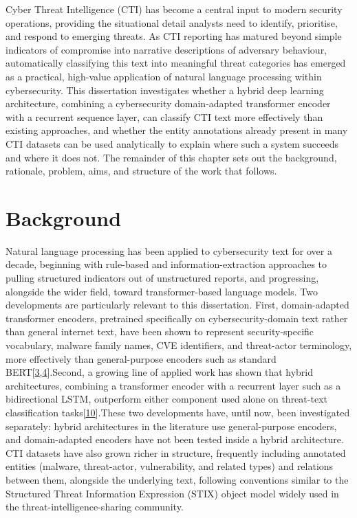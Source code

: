 \documentclass[12pt,a4paper]{report}
\begin{document}
Cyber Threat Intelligence (CTI) has become a central input to modern
security operations, providing the situational detail analysts need to
identify, prioritise, and respond to emerging threats. As CTI reporting
has matured beyond simple indicators of compromise into narrative
descriptions of adversary behaviour, automatically classifying this text
into meaningful threat categories has emerged as a practical, high-value
application of natural language processing within cybersecurity. This
dissertation investigates whether a hybrid deep learning architecture,
combining a cybersecurity domain-adapted transformer encoder with a
recurrent sequence layer, can classify CTI text more effectively than
existing approaches, and whether the entity annotations already present
in many CTI datasets can be used analytically to explain where such a
system succeeds and where it does not. The remainder of this chapter
sets out the background, rationale, problem, aims, and structure of the
work that follows.

\protect{}\label{_Toc239502923}{}\section{Background}

Natural language processing has been applied to cybersecurity text for
over a decade, beginning with rule-based and information-extraction
approaches to pulling structured indicators out of unstructured reports,
and progressing, alongside the wider field, toward transformer-based
language models. Two developments are particularly relevant to this
dissertation. First, domain-adapted transformer encoders, pretrained
specifically on cybersecurity-domain text rather than general internet
text, have been shown to represent security-specific vocabulary, malware
family names, CVE identifiers, and threat-actor terminology, more
effectively than general-purpose encoders such as standard
BERT{[}\href{file:///D:/Downloads/final-report-formatted-v4(1).docx\#ref_3}{\ul{3}},\href{file:///D:/Downloads/final-report-formatted-v4(1).docx\#ref_4}{\ul{4}}{]}.Second,
a growing line of applied work has shown that hybrid architectures,
combining a transformer encoder with a recurrent layer such as a
bidirectional LSTM, outperform either component used alone on
threat-text classification
tasks{[}\href{file:///D:/Downloads/final-report-formatted-v4(1).docx\#ref_10}{\ul{10}}{]}.These
two developments have, until now, been investigated separately: hybrid
architectures in the literature use general-purpose encoders, and
domain-adapted encoders have not been tested inside a hybrid
architecture. CTI datasets have also grown richer in structure,
frequently including annotated entities (malware, threat-actor,
vulnerability, and related types) and relations between them, alongside
the underlying text, following conventions similar to the Structured
Threat Information Expression (STIX) object model widely used in the
threat-intelligence-sharing community.
\end{document}
